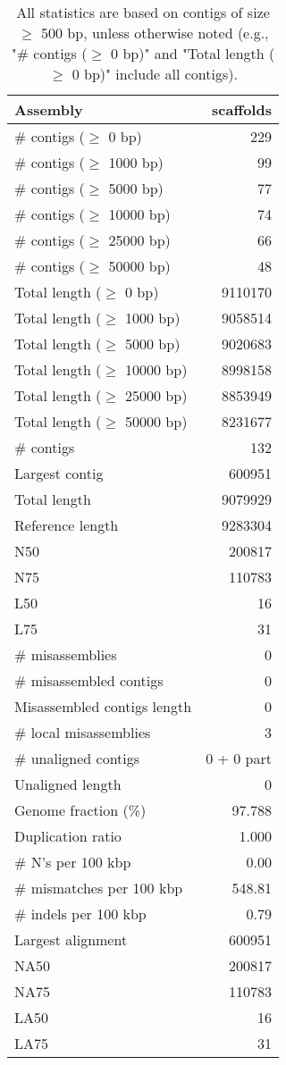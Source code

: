 \documentclass[12pt,a4paper]{article}
\begin{document}
\begin{table}[ht]
\begin{center}
\caption{All statistics are based on contigs of size $\geq$ 500 bp, unless otherwise noted (e.g., "\# contigs ($\geq$ 0 bp)" and "Total length ($\geq$ 0 bp)" include all contigs).}
\begin{tabular}{|l*{1}{|r}|}
\hline
Assembly & scaffolds \\ \hline
\# contigs ($\geq$ 0 bp) & 229 \\ \hline
\# contigs ($\geq$ 1000 bp) & 99 \\ \hline
\# contigs ($\geq$ 5000 bp) & 77 \\ \hline
\# contigs ($\geq$ 10000 bp) & 74 \\ \hline
\# contigs ($\geq$ 25000 bp) & 66 \\ \hline
\# contigs ($\geq$ 50000 bp) & 48 \\ \hline
Total length ($\geq$ 0 bp) & 9110170 \\ \hline
Total length ($\geq$ 1000 bp) & 9058514 \\ \hline
Total length ($\geq$ 5000 bp) & 9020683 \\ \hline
Total length ($\geq$ 10000 bp) & 8998158 \\ \hline
Total length ($\geq$ 25000 bp) & 8853949 \\ \hline
Total length ($\geq$ 50000 bp) & 8231677 \\ \hline
\# contigs & 132 \\ \hline
Largest contig & 600951 \\ \hline
Total length & 9079929 \\ \hline
Reference length & 9283304 \\ \hline
N50 & 200817 \\ \hline
N75 & 110783 \\ \hline
L50 & 16 \\ \hline
L75 & 31 \\ \hline
\# misassemblies & 0 \\ \hline
\# misassembled contigs & 0 \\ \hline
Misassembled contigs length & 0 \\ \hline
\# local misassemblies & 3 \\ \hline
\# unaligned contigs & 0 + 0 part \\ \hline
Unaligned length & 0 \\ \hline
Genome fraction (\%) & 97.788 \\ \hline
Duplication ratio & 1.000 \\ \hline
\# N's per 100 kbp & 0.00 \\ \hline
\# mismatches per 100 kbp & 548.81 \\ \hline
\# indels per 100 kbp & 0.79 \\ \hline
Largest alignment & 600951 \\ \hline
NA50 & 200817 \\ \hline
NA75 & 110783 \\ \hline
LA50 & 16 \\ \hline
LA75 & 31 \\ \hline
\end{tabular}
\end{center}
\end{table}
\end{document}
